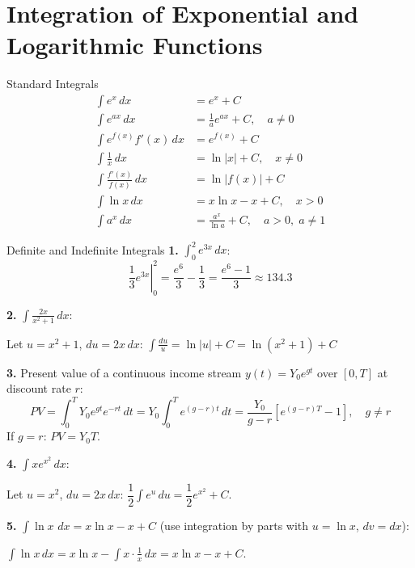 \documentclass[12pt, a4paper]{article}
\theoremstyle{definition}
\newcommand{\dd}[1]{\,d#1}
\newcommand{\eval}[2]{\left.#1\right|_{#2}}
\begin{document}
\section{Integration of Exponential and Logarithmic Functions}

\begin{thmbox}{Standard Integrals}
\begin{align}
  \int e^x \dd{x} &= e^x + C \label{eq:intex}\\[4pt]
  \int e^{ax} \dd{x} &= \frac{1}{a}e^{ax} + C, \quad a \neq 0 \label{eq:inteax}\\[4pt]
  \int e^{f(x)}f'(x) \dd{x} &= e^{f(x)} + C \label{eq:intchain}\\[4pt]
  \int \frac{1}{x} \dd{x} &= \ln|x| + C, \quad x \neq 0 \label{eq:intrecip}\\[4pt]
  \int \frac{f'(x)}{f(x)} \dd{x} &= \ln|f(x)| + C \label{eq:intlogchain}\\[4pt]
  \int \ln x \dd{x} &= x\ln x - x + C, \quad x > 0 \label{eq:intlnx}\\[4pt]
  \int a^x \dd{x} &= \frac{a^x}{\ln a} + C, \quad a>0,\;a\neq 1 \label{eq:intax}
\end{align}
\end{thmbox}

\begin{exbox}{Definite and Indefinite Integrals}
\textbf{1.} $\displaystyle\int_0^2 e^{3x}\dd{x}$:
\[
  \eval{\frac{1}{3}e^{3x}}{0}^{2}
  = \frac{e^6}{3} - \frac{1}{3}
  = \frac{e^6-1}{3} \approx 134.3
\]

\textbf{2.} $\displaystyle\int \frac{2x}{x^2+1}\dd{x}$:

Let $u = x^2+1$, $du = 2x\,dx$:
$\displaystyle\int \frac{du}{u} = \ln|u| + C = \ln(x^2+1) + C$

\textbf{3.} Present value of a continuous income stream $y(t)=Y_0e^{gt}$ over $[0,T]$ at discount rate $r$:
\[
  PV = \int_0^T Y_0 e^{gt} e^{-rt}\dd{t}
     = Y_0\int_0^T e^{(g-r)t}\dd{t}
     = \frac{Y_0}{g-r}\left[e^{(g-r)T}-1\right], \quad g \neq r
\]
If $g = r$: $PV = Y_0 T$.

\textbf{4.} $\displaystyle\int x e^{x^2}\dd{x}$:

Let $u=x^2$, $du=2x\,dx$:
$\dfrac{1}{2}\displaystyle\int e^u\dd{u} = \dfrac{1}{2}e^{x^2}+C$.

\textbf{5.} $\displaystyle\int \ln x\,\dd{x} = x\ln x - x + C$ (use integration by parts with $u=\ln x$, $dv=dx$):

$\displaystyle\int \ln x\,dx = x\ln x - \int x\cdot\frac{1}{x}\dd{x} = x\ln x - x + C$.
\end{exbox}
\end{document}

